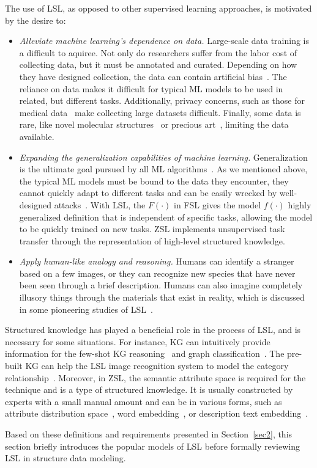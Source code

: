 The use of LSL, as opposed to other supervised learning approaches, is motivated by the desire to:
\begin{itemize}
\item \textit{Alleviate machine learning's dependence on data.} Large-scale data training is a difficult to aquiree. Not only do researchers suffer from the labor cost of collecting data, but it must be annotated and curated. Depending on how they have designed collection, the data can contain artificial bias~. The reliance on data makes it difficult for typical ML models to be used in related, but different tasks. Additionally, privacy concerns, such as those for medical data~ make collecting large datasets difficult. Finally, some data is rare, like novel molecular structures~
or precious art~, limiting the data available.
\item \textit{Expanding the generalization capabilities of machine learning.} Generalization is the ultimate goal pursued by all ML algorithms~. As we mentioned above, the typical ML models must be bound to the data they encounter, they cannot quickly adapt to different tasks and can be easily wrecked by well-designed attacks~. With LSL, the $F(\cdot)$ in FSL gives the model $f(\cdot)$ highly generalized definition that is independent of specific tasks, allowing the model to be quickly trained on new tasks. ZSL implements unsupervised task transfer through the representation of high-level structured knowledge.
\item \textit{Apply human-like analogy and reasoning.} Humans can identify a stranger based on a few images, or they can recognize new species that have never been seen through a brief description.  Humans can also imagine completely illusory things through the materials that exist in reality, which is discussed in some pioneering studies of LSL~.
\end{itemize}
Structured knowledge has played a beneficial role in the process of LSL, and is necessary for some situations. For instance, KG can intuitively provide information for the few-shot KG reasoning~ and graph classification~. The pre-built KG can help the LSL image recognition system to model the category relationship~. Moreover, in ZSL, the semantic attribute space is required for the technique and is a type of structured knowledge. It is usually constructed by experts with a small manual amount and can be in various forms, such as attribute distribution space~, word embedding~, or description text embedding~.

\label{sec3}
 Based on these definitions and requirements presented in Section~\ref{sec2}, this section briefly introduces the popular models of LSL before formally reviewing LSL in structure data modeling.

